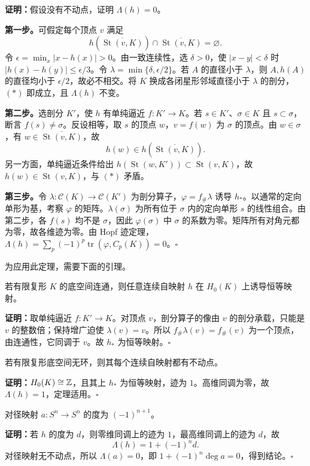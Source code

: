 \noindent\textbf{证明：}假设没有不动点，证明 $\Lambda(h)=0$。

\textbf{第一步。}可假定每个顶点 $v$ 满足
\[
h(\overline{\operatorname{St}(v,K)})\cap\overline{\operatorname{St}(v,K)}=\varnothing.\tag{$*$}
\]
令 $\epsilon=\min_x|x-h(x)|>0$。由一致连续性，选 $\delta>0$，使 $|x-y|<\delta$ 时 $|h(x)-h(y)|\leq\epsilon/3$。令 $\lambda=\min\{\delta,\epsilon/2\}$。若 $A$ 的直径小于 $\lambda$，则 $A,h(A)$ 的直径均小于 $\epsilon/2$，故必不相交。将 $K$ 换成各闭星形邻域直径小于 $\lambda$ 的剖分，$(*)$ 即成立，且 $\Lambda(h)$ 不变。

\textbf{第二步。}选剖分 $K'$，使 $h$ 有单纯逼近 $f:K'\to K$。若 $s\in K'$、$\sigma\in K$ 且 $s\subset\sigma$，断言 $f(s)\ne\sigma$。反设相等，取 $s$ 的顶点 $w$，$v=f(w)$ 为 $\sigma$ 的顶点。由 $w\in\sigma$，有 $w\in\overline{\operatorname{St}(v,K)}$，故
\[
h(w)\in h(\overline{\operatorname{St}(v,K)}).
\]
另一方面，单纯逼近条件给出 $h(\operatorname{St}(w,K'))\subset\operatorname{St}(v,K)$，故 $h(w)\in\operatorname{St}(v,K)$，与 $(*)$ 矛盾。

\textbf{第三步。}令 $\lambda:\mathcal C(K)\to\mathcal C(K')$ 为剖分算子，$\varphi=f_\#\lambda$ 诱导 $h_*$。以通常的定向单形为基，考察 $\varphi$ 的矩阵。$\lambda(\sigma)$ 为所有位于 $\sigma$ 内的定向单形 $s$ 的线性组合。由第二步，各 $f(s)$ 均不是 $\sigma$，因此 $\varphi(\sigma)$ 中 $\sigma$ 的系数为零。矩阵所有对角元都为零，故各维迹为零。由 Hopf 迹定理，$\Lambda(h)=\sum_p(-1)^p\operatorname{tr}(\varphi,C_p(K))=0$。\hfill$\square$

为应用此定理，需要下面的引理。

若有限复形 $K$ 的底空间连通，则任意连续自映射 $h$ 在 $H_0(K)$ 上诱导恒等映射。

\noindent\textbf{证明：}取单纯逼近 $f:K'\to K$。对顶点 $v$，剖分算子的像由 $v$ 的剖分承载，只能是 $v$ 的整数倍；保持增广迫使 $\lambda(v)=v$。所以 $f_\#\lambda(v)=f_\#(v)$ 为一个顶点，由连通性，它同调于 $v$。故 $h_*$ 为恒等映射。\hfill$\square$

若有限复形底空间无环，则其每个连续自映射都有不动点。

\noindent\textbf{证明：}$H_0(K)\cong\mathbb{Z}$，且其上 $h_*$ 为恒等映射，迹为 $1$。高维同调为零，故 $\Lambda(h)=1$，定理适用。\hfill$\square$

对径映射 $a:S^n\to S^n$ 的度为 $(-1)^{n+1}$。

\noindent\textbf{证明：}若 $h$ 的度为 $d$，则零维同调上的迹为 $1$，最高维同调上的迹为 $d$，故
\[
\Lambda(h)=1+(-1)^n d.\tag{$\dagger$}
\]
对径映射无不动点，所以 $\Lambda(a)=0$，即 $1+(-1)^n\deg a=0$，得到结论。\hfill$\square$

